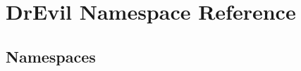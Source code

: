 \hypertarget{namespace_dr_evil}{}\section{Dr\+Evil Namespace Reference}
\label{namespace_dr_evil}
\subsection*{Namespaces}
\begin{DoxyCompactItemize}
\end{DoxyCompactItemize}
